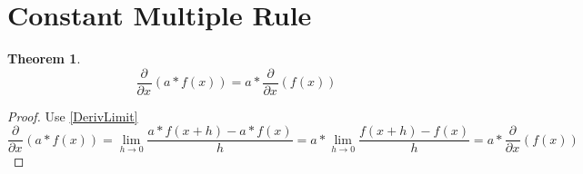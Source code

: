 \documentclass[]{article}
\newcommand{\pqty}[1]{{\left(#1\right)}}
\newcommand{\pdiff}[2]{\frac{\partial^{#2}}{\partial #1^{#2}}}
\newtheorem{theorem}{Theorem}[section]
\numberwithin{equation}{section}
\begin{document}
	\section{Constant Multiple Rule}
	\begin{theorem}
		\begin{equation}
			\pdiff{x}{}\pqty{a*f\pqty{x}}=
			a*\pdiff{x}{}\pqty{f\pqty{x}}
		\end{equation}
	\end{theorem}
	\begin{proof}
		Use \eqref{DerivLimit}
		\begin{equation}
		\pdiff{x}{}\pqty{a*f\pqty{x}}=
		\lim\limits_{h\to 0}\frac{a*f\pqty{x+h}-a*f\pqty{x}}{h}=
		a*\lim\limits_{h\to 0}\frac{f\pqty{x+h}-f\pqty{x}}{h}=
		a*\pdiff{x}{}\pqty{f\pqty{x}}
		\end{equation}
	\end{proof}
	
\end{document}
